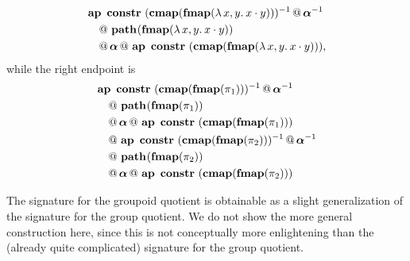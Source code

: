 \begin{itemize}
\begin{align*}
& \hconcat{\hap{\constr}{\hinv{(\hcompconst{\fmap(\Lam {x,y}. x \cdot y)})}}}{\hinv{\hassocN}} \\
& \quad \hconcat{}{\hconstr{}{\fmap(\Lam {x,y}. x \cdot y)}} \\
& \quad \hconcat{}{\hconcat{\hassocN}{\hap{\constr}{(\hcompconst{\fmap(\Lam {x,y}. x \cdot y)})}}},
\end{align*}
while the right endpoint is
\begin{align*}
& \operatorname{\mathbf{ap}} \ \operatorname{\mathbf{constr}} \ (\operatorname{\mathbf{cmap}}(\operatorname{\mathbf{fmap}}(\pi_1)))^{-1} \, @ \, 
\boldsymbol\alpha^{-1} \\
& \quad \, @ \, \operatorname{\mathbf{path}}_{}(\operatorname{\mathbf{fmap}}(\pi_1)) \\
& \quad \, @ \, \boldsymbol\alpha \, @ \, \operatorname{\mathbf{ap}} \ \operatorname{\mathbf{constr}} \ (\operatorname{\mathbf{cmap}}(\operatorname{\mathbf{fmap}}(\pi_1))) \\
& \quad \, @ \, \operatorname{\mathbf{ap}} \ \operatorname{\mathbf{constr}} \ (\operatorname{\mathbf{cmap}}(\operatorname{\mathbf{fmap}}(\pi_2)))^{-1} \, @ \, \boldsymbol\alpha^{-1} \\
& \quad \, @ \, \operatorname{\mathbf{path}}_{}(\operatorname{\mathbf{fmap}}(\pi_2)) \\
& \quad \, @ \, \boldsymbol\alpha \, @ \, \operatorname{\mathbf{ap}} \ \operatorname{\mathbf{constr}} \ (\operatorname{\mathbf{cmap}}(\operatorname{\mathbf{fmap}}(\pi_2)))
\end{align*}
\end{itemize}

The signature for the groupoid quotient is obtainable as a slight
generalization of the signature for the group quotient. We do not show
the more general construction here, since this is not conceptually
more enlightening than the (already quite complicated) signature for
the group quotient.

